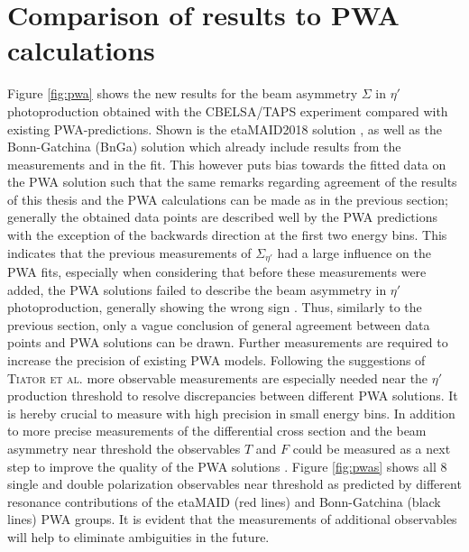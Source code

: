 \section{Comparison of results to PWA calculations}
Figure \ref{fig:pwa} shows the new results for the beam asymmetry $\Sigma$ in $\eta'$ photoproduction obtained with the CBELSA/TAPS experiment compared with existing PWA-predictions. Shown is the etaMAID2018 solution \cite{etaMAID}, as well as the Bonn-Gatchina (BnGa) solution \cite{etap_bnga} which already include results from the measurements \cite{collins} and \cite{thresh} in the fit. This however puts bias towards  the fitted data on the PWA solution such that the same remarks regarding agreement of the results of this thesis and the PWA calculations can be made as in the previous section; generally the obtained data points are described well by the PWA predictions with the exception of the backwards direction at the first two energy bins. This indicates that the previous measurements of $\Sigma_{\eta'}$ had a large influence on the PWA fits, especially when considering that before these measurements were added, the PWA solutions failed to describe the beam asymmetry in $\eta'$ photoproduction, generally showing the wrong sign \cite{collins}. Thus, similarly to the previous section, only a vague conclusion of general agreement between data points and PWA solutions can be drawn. Further measurements are required to increase the precision of existing PWA models. Following the suggestions of \textsc{Tiator et al.} \cite{etaMAID} more observable measurements are especially needed near the $\eta'$ production threshold to resolve discrepancies between different PWA solutions. It is hereby crucial to measure with high precision in small energy bins. In addition to more precise measurements of the differential cross section and the beam asymmetry near threshold the observables $T$ and $F$ could be measured as a next step to improve the quality of the PWA solutions \cite{etaMAID}. Figure \ref{fig:pwas} shows all 8 single and double polarization observables near threshold as predicted by different resonance contributions of the etaMAID \cite{etaMAID} (red lines) and Bonn-Gatchina \cite{etap_bnga} (black lines) PWA groups. It is evident that the measurements of additional observables will help to eliminate ambiguities in the future.
